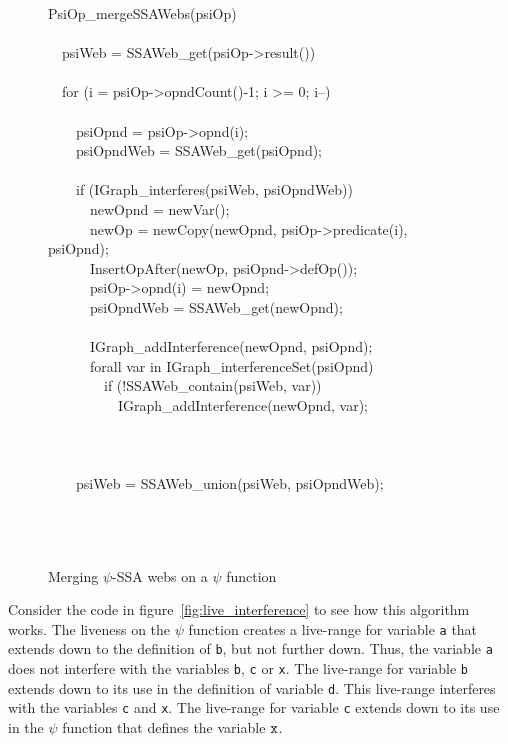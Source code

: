 \begin{figure}
\begin{center}
\footnotesize
PsiOp\_mergeSSAWebs(psiOp) { \\
\\
\ \ psiWeb = SSAWeb\_get(psiOp->result()) \\
\\
\ \ for (i = psiOp->opndCount()-1; i >= 0; i--) { \\
\\
\ \ \ \ psiOpnd = psiOp->opnd(i); \\
\ \ \ \ psiOpndWeb = SSAWeb\_get(psiOpnd); \\
\\
\ \ \ \ if (IGraph\_interferes(psiWeb, psiOpndWeb)) { \\
\ \ \ \ \ \ newOpnd = newVar(); \\
\ \ \ \ \ \ newOp = newCopy(newOpnd, psiOp->predicate(i), psiOpnd); \\
\ \ \ \ \ \ InsertOpAfter(newOp, psiOpnd->defOp()); \\
\ \ \ \ \ \ psiOp->opnd(i) = newOpnd; \\
\ \ \ \ \ \ psiOpndWeb = SSAWeb\_get(newOpnd); \\
\\
\ \ \ \ \ \ IGraph\_addInterference(newOpnd, psiOpnd); \\
\ \ \ \ \ \ forall var in IGraph\_interferenceSet(psiOpnd) { \\
\ \ \ \ \ \ \ \ if (!SSAWeb\_contain(psiWeb, var)) \\
\ \ \ \ \ \ \ \ \ \ IGraph\_addInterference(newOpnd, var); \\
\ \ \ \ \ \ } \\
\ \ \ \ } \\
\\
\ \ \ \ psiWeb = SSAWeb\_union(psiWeb, psiOpndWeb); \\
\ \ } \\
} \\
\\
\caption{Merging $\psi$-SSA webs on a $\psi$ function}
\label{fig:pseudo_psi_repair}
\end{center}
\end{figure}


Consider the code in figure~\ref{fig:live_interference} to see how
this algorithm works. The liveness on the $\psi$ function creates a
live-range for variable {\tt a} that extends down to the definition of
{\tt b}, but not further down. Thus, the variable {\tt a} does not
interfere with the variables {\tt b}, {\tt c} or {\tt x}. The
live-range for variable {\tt b} extends down to its use in the
definition of variable {\tt d}. This live-range interferes with the
variables {\tt c} and {\tt x}. The live-range for variable {\tt c}
extends down to its use in the $\psi$ function that defines the
variable ${\tt x}$.

